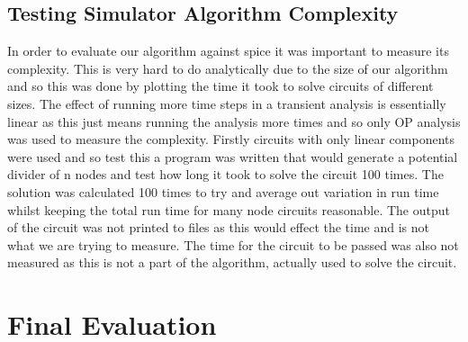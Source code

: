 \documentclass{article}
\begin{document}
\subsection{Testing Simulator Algorithm Complexity}
In order to evaluate our algorithm against spice it was important to measure its complexity. This is very hard to do analytically due to the size of our algorithm and so this was done by plotting the time it took to solve circuits of different sizes. The effect of running more time steps in a transient analysis is essentially linear as this just means running the analysis more times and so only OP analysis was used to measure the complexity. Firstly circuits with only linear components were used and so test this a program was written that would generate a potential divider of n nodes and test how long it took to solve the circuit 100 times. The solution was calculated 100 times to try and average out variation in run time whilst keeping the total run time for many node circuits reasonable. The output of the circuit was not printed to files as this would effect the time and is not what we are trying to measure. The time for the circuit to be passed was also not measured as this is not a part of the algorithm, actually used to solve the circuit. 
\section{Final Evaluation}

\newpage





\end{document}
